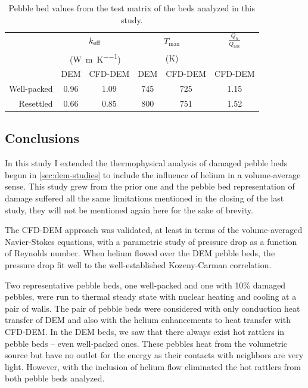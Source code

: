 \begin {table}[htp] %
\caption{Pebble bed values from the test matrix of the beds analyzed in this study.}
\label {tab:cfdem-keff} \centering %
\begin {tabular}{ rccccc }
\toprule %
			& 	\multicolumn{2}{c}{$k_\text{eff}$}	&   \multicolumn{2}{c}{$T_\text{max}$}	&	$\frac{Q_h}{Q_\text{nuc}}$		\\
			& 	\multicolumn{2}{c}{(\si{\watt\per\meter\per\kelvin})}			&	\multicolumn{2}{c}{(\si{\kelvin})}				&									\\
			& 	DEM 		& 	CFD-DEM				&	DEM 		& 	CFD-DEM 			& 	CFD-DEM							\\\toprule
Well-packed	& 	0.96		& 	1.09				& 	745			& 	725					& 	1.15							\\
Resettled	& 	0.66		& 	0.85				& 	800			& 	751					& 	1.52							\\\bottomrule
\end{tabular}
\end{table}





\FloatBarrier



\subsection{Conclusions}

In this study I extended the thermophysical analysis of damaged pebble beds begun in \cref{sec:dem-studies} to include the influence of helium in a volume-average sense. This study grew from the prior one and the pebble bed representation of damage suffered all the same limitations mentioned in the closing of the last study, they will not be mentioned again here for the sake of brevity.

The CFD-DEM approach was validated, at least in terms of the volume-averaged Navier-Stokes equations, with a parametric study of pressure drop as a function of Reynolds number. When helium flowed over the DEM pebble beds, the pressure drop fit well to the well-established Kozeny-Carman correlation.

Two representative pebble beds, one well-packed and one with 10\% damaged pebbles, were run to thermal steady state with nuclear heating and cooling at a pair of walls.  The pair of pebble beds were considered with only conduction heat transfer of DEM and also with the helium enhancements to heat transfer with CFD-DEM. In the DEM beds, we saw that there always exist hot rattlers in pebble beds -- even well-packed ones. These pebbles heat from the volumetric source but have no outlet for the energy as their contacts with neighbors are very light. However, with the inclusion of helium flow eliminated the hot rattlers from both pebble beds analyzed.

